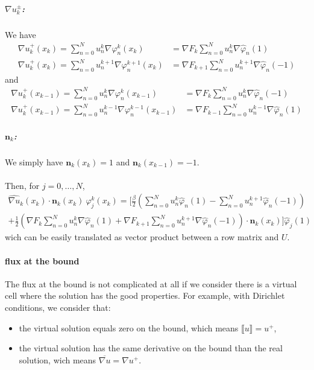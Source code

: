\documentclass[a4paper,10pt,draft]{article}
\begin{document}
\subparagraph{$\nabla u^\pm_k$:} We have
\begin{align*}
 \nabla u^+_k(x_k) = \sum_{n=0}^N u_n^k \nabla \varphi_n^k(x_k) &= \nabla F_k \sum_{n=0}^N 
u_n^k \nabla \hat \varphi_n(1) \\
\nabla u^+_k(x_k) = \sum_{n=0}^N u_n^{k+1} \nabla \varphi_n^{k+1}(x_k) &= \nabla F_{k+1} 
\sum_{n=0}^N u_n^{k+1} \nabla \hat \varphi_n(-1)
\end{align*}
and
\begin{align*}
 \nabla u^+_k(x_{k-1}) = \sum_{n=0}^N u_n^k \nabla \varphi_n^k(x_{k-1}) &= \nabla F_k \sum_{n=0}^N 
u_n^k \nabla \hat \varphi_n(-1) \\
\nabla u^+_k(x_{k-1}) = \sum_{n=0}^N u_n^{k-1} \nabla \varphi_n^{k-1}(x_{k-1}) &= \nabla F_{k-1} 
\sum_{n=0}^N 
u_n^{k-1} \nabla \hat \varphi_n(1)
\end{align*}

\subparagraph{$\mathbf{n}_k$:} We simply have $\mathbf{n}_k(x_k) = 1$ and $\mathbf{n}_k(x_{k-1}) = 
-1$.

\paragraph{}

Then, for $j=0,\dots,N$,
\begin{multline*}
 \widehat{\nabla u}_k(x_k) \cdot \mathbf{n}_k(x_k)\ \varphi_j^k(x_k) 
 = \Bigg[ \frac{\beta}{2} \left( \sum_{n=0}^N u_n^k \hat \varphi_n(1) - \sum_{n=0}^N u_n^{k+1} 
\hat 
\varphi_n(-1) \right) 
\\+ \frac{1}{2} \left(\nabla F_k \sum_{n=0}^N u_n^k \nabla \hat \varphi_n(1) + \nabla F_{k+1} 
\sum_{n=0}^N u_n^{k+1} \nabla \hat \varphi_n(-1) \right) \cdot \mathbf{n}_k(x_k) \Bigg] 
\hat \varphi_j(1)
\end{multline*}
wich can be easily translated as vector product between a row matrix and $U$.

\paragraph{flux at the bound}
The flux at the bound is not complicated at all if we consider there is a virtual cell where the 
solution has the good properties. For example, with Dirichlet conditions, we consider that:
\begin{itemize}
 \item the virtual solution equals zero on the bound, which means $\llbracket u \rrbracket = u^+ $,
 \item the virtual solution has the same derivative on the bound than the real solution, wich means 
$\overline{\nabla u} = \nabla u^+$.
\end{itemize}
\end{document}
